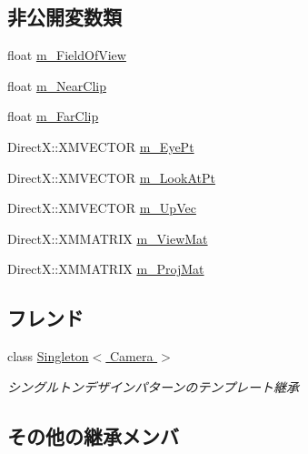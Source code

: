 \subsection*{非公開変数類}
\begin{DoxyCompactItemize}
\item 
float \hyperlink{class_camera_a61ed8246ec6d6d78b046d88f3f5b8bc0}{m\+\_\+\+Field\+Of\+View}
\item 
float \hyperlink{class_camera_a4bea0bad40f6b75b9c5eb19801a684a7}{m\+\_\+\+Near\+Clip}
\item 
float \hyperlink{class_camera_a803e5e33c136572ec2c31b221d2ce67f}{m\+\_\+\+Far\+Clip}
\item 
Direct\+X\+::\+X\+M\+V\+E\+C\+T\+OR \hyperlink{class_camera_a80c72afef85ca175279420cce520370d}{m\+\_\+\+Eye\+Pt}
\item 
Direct\+X\+::\+X\+M\+V\+E\+C\+T\+OR \hyperlink{class_camera_ab9dac33a4cb297f8ecdd55444df9a926}{m\+\_\+\+Look\+At\+Pt}
\item 
Direct\+X\+::\+X\+M\+V\+E\+C\+T\+OR \hyperlink{class_camera_ac1e1df300cece76a2d49ee2a1d678301}{m\+\_\+\+Up\+Vec}
\item 
Direct\+X\+::\+X\+M\+M\+A\+T\+R\+IX \hyperlink{class_camera_a06ae0945a26221c132c14896d09d1a3b}{m\+\_\+\+View\+Mat}
\item 
Direct\+X\+::\+X\+M\+M\+A\+T\+R\+IX \hyperlink{class_camera_afb229fa24074664a441b129fef4cce87}{m\+\_\+\+Proj\+Mat}
\end{DoxyCompactItemize}
\subsection*{フレンド}
\begin{DoxyCompactItemize}
\item 
class \hyperlink{class_camera_a6f66ad73633ee0655fdb0e0468c1086a}{Singleton$<$ Camera $>$}\hypertarget{class_camera_a6f66ad73633ee0655fdb0e0468c1086a}{}\label{class_camera_a6f66ad73633ee0655fdb0e0468c1086a}

\begin{DoxyCompactList}\small\item\em シングルトンデザインパターンのテンプレート継承 \end{DoxyCompactList}\end{DoxyCompactItemize}
\subsection*{その他の継承メンバ}


